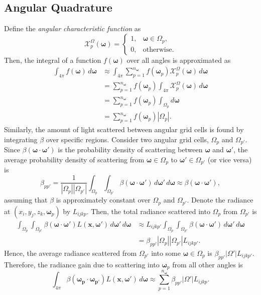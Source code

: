 \documentclass[ms,cpyr,lof,lot]{uathesis}
\newcommand\abs[1]{\left| #1 \right|}
\renewcommand\vec\bm
\newcommand\nomega{{n_{\vec{\omega}}}}
\begin{document}
\subsection{Angular Quadrature}
Define the \textit{angular characteristic function} as
\begin{equation*}
  \mathcal{X}^\Omega_p(\vec{\omega}) = \begin{cases}
    1, & \vec{\omega} \in \Omega_p, \\
    0, & \mbox{otherwise}.
  \end{cases}
\end{equation*}
Then, the integral of a function $f(\vec{\omega})$ over all angles is approximated as
\begin{align*}
  \int_{4\pi} f(\vec{\omega})\, d\vec{\omega} &\approx \int_{4\pi} \sum_{p=1}^\nomega f(\vec{\omega}_p) \mathcal{X}^\Omega_p(\vec{\omega})\, d\vec{\omega} \\
  &= \sum_{p=1}^\nomega f(\vec{\omega}_p) \int_{4\pi} \mathcal{X}^\Omega_p(\vec{\omega})\, d\vec{\omega} \\
  &= \sum_{p=1}^\nomega f(\vec{\omega}_p) \int_{\Omega_p} d\vec{\omega} \\
  &= \sum_{p=1}^\nomega f(\vec{\omega}_p) \abs{\Omega_p}.
\end{align*}
Similarly, the amount of light scattered between angular grid cells is found by integrating $\beta$ over specific regions.
Consider two angular grid cells, $\Omega_p$ and $\Omega_{p'}$.
Since $\beta(\vec{\omega}\cdot\vec{\omega}')$ is the probability density of scattering between $\vec{\omega}$ and $\vec{\omega}'$, the average probability density of scattering from $\vec{\omega} \in \Omega_p$ to $\vec{\omega}' \in \Omega_{p'}$ (or vice versa) is
\begin{equation*}
  \beta_{pp'} = \frac{1}{\abs{\Omega_p}\abs{\Omega_{p'}}} \int_{\Omega_p}\int_{\Omega_{p'}}\beta(\vec{\omega}\cdot\vec{\omega}')\, d\vec{\omega'}\, d\vec{\omega} \approx \beta(\vec{\omega}\cdot\vec{\omega}'),
\end{equation*}
assuming that $\beta$ is approximately constant over $\Omega_p$ and $\Omega_{p'}$.
Denote the radiance at $(x_i, y_j, z_k, \vec{\omega}_p)$ by $L_{ijkp}$.
Then, the total radiance scattered into $\Omega_p$ from $\Omega_{p'}$ is
\begin{align*}
  \int_{\Omega_p}\int_{\Omega_{p'}}\beta(\vec{\omega} \cdot \vec{\omega}')L(\vec{x},\vec{\omega}')\, d\vec{\omega}'\, d\vec{\omega}
  &\approx L_{ijkp'} \int_{\Omega_p}\int_{\Omega_{p'}} \beta(\vec{\omega} \cdot \vec{\omega}')\, d\vec{\omega}'\, d\vec{\omega} \\
  &= \beta_{pp'}\abs{\Omega_p}\abs{\Omega_{p'}}L_{ijkp'}.
\end{align*}
Hence, the average radiance scattered from $\Omega_{p'}$ into some $\vec{\omega} \in \Omega_p$ is $\beta_{pp'}\abs{\Omega'}L_{ijkp'}$.
Therefore, the radiance gain due to scattering into $\vec{\omega}_p$ from all other angles is
\begin{equation}
  \int_{4\pi}\beta(\vec{\omega_p}\cdot\vec{\omega_{p'}})L(\vec{x}, \vec{\omega}')\, d\vec{\omega} \approx \sum_{p=1}^\nomega \beta_{pp'}\abs{\Omega'}L_{ijkp}.
  \label{eqn:scatter_integral}
\end{equation}
\end{document}
